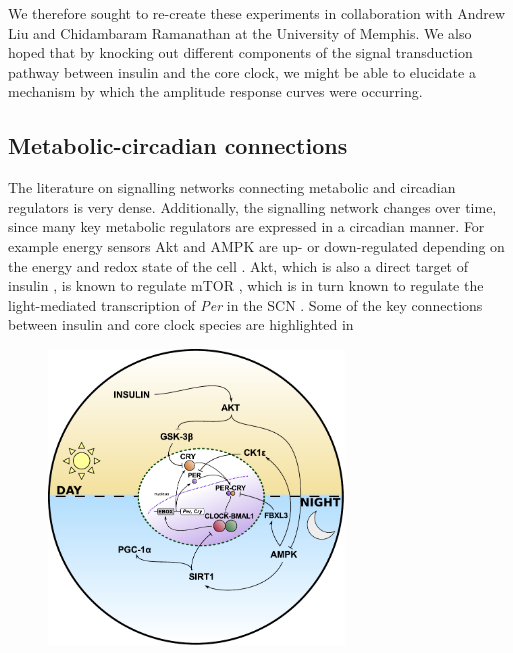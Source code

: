 We therefore sought to re-create these experiments in collaboration with Andrew Liu and Chidambaram Ramanathan at the University of Memphis.
We also hoped that by knocking out different components of the signal transduction pathway between insulin and the core clock, we might be able to elucidate a mechanism by which the amplitude response curves were occurring.

\subsection{Metabolic-circadian connections}
The literature on signalling networks connecting metabolic and circadian regulators is very dense.
Additionally, the signalling network changes over time, since many key metabolic regulators are expressed in a circadian manner.
For example energy sensors Akt and AMPK are up- or down-regulated depending on the energy and redox state of the cell \cite{Naimi2010}.
Akt, which is also a direct target of insulin \cite{Luni2011}, is known to regulate mTOR \cite{Hahn-Windgassen2005}, which is in turn known to regulate the light-mediated transcription of {\itshape Per} in the SCN \cite{Cao2010}.
Some of the key connections between insulin and core clock species are highlighted in 

\begin{figure}[tbp]
  \centering
  \includegraphics[width=0.7\textwidth]{chap7/figures/metabolic_connections.pdf}
  \label{fig:connections}
\end{figure}


